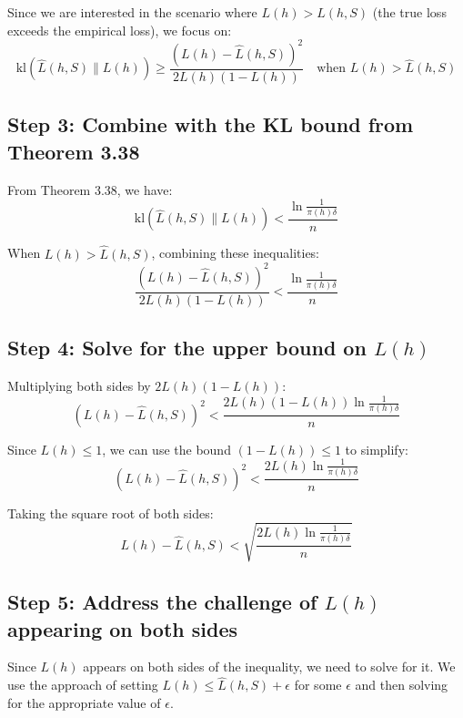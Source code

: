 \documentclass{article}
\begin{document}
Since we are interested in the scenario where $L(h) > \hat{L}(h,S)$ (the true loss exceeds the empirical loss), we focus on:
\begin{equation}
\text{kl}(\hat{L}(h,S)\|L(h)) \geq \frac{(L(h) - \hat{L}(h,S))^2}{2L(h)(1-L(h))} \quad \text{when } L(h) > \hat{L}(h,S)
\end{equation}

\subsection{Step 3: Combine with the KL bound from Theorem 3.38}

From Theorem 3.38, we have:
\begin{equation}
\text{kl}(\hat{L}(h,S)\|L(h)) < \frac{\ln \frac{1}{\pi(h)\delta}}{n}
\end{equation}

When $L(h) > \hat{L}(h,S)$, combining these inequalities:
\begin{equation}
\frac{(L(h) - \hat{L}(h,S))^2}{2L(h)(1-L(h))} < \frac{\ln \frac{1}{\pi(h)\delta}}{n}
\end{equation}

\subsection{Step 4: Solve for the upper bound on $L(h)$}

Multiplying both sides by $2L(h)(1-L(h))$:
\begin{equation}
(L(h) - \hat{L}(h,S))^2 < \frac{2L(h)(1-L(h))\ln \frac{1}{\pi(h)\delta}}{n}
\end{equation}

Since $L(h) \leq 1$, we can use the bound $(1-L(h)) \leq 1$ to simplify:
\begin{equation}
(L(h) - \hat{L}(h,S))^2 < \frac{2L(h)\ln \frac{1}{\pi(h)\delta}}{n}
\end{equation}

Taking the square root of both sides:
\begin{equation}
L(h) - \hat{L}(h,S) < \sqrt{\frac{2L(h)\ln \frac{1}{\pi(h)\delta}}{n}}
\end{equation}

\subsection{Step 5: Address the challenge of $L(h)$ appearing on both sides}

Since $L(h)$ appears on both sides of the inequality, we need to solve for it. We use the approach of setting $L(h) \leq \hat{L}(h,S) + \epsilon$ for some $\epsilon$ and then solving for the appropriate value of $\epsilon$.
\end{document}
